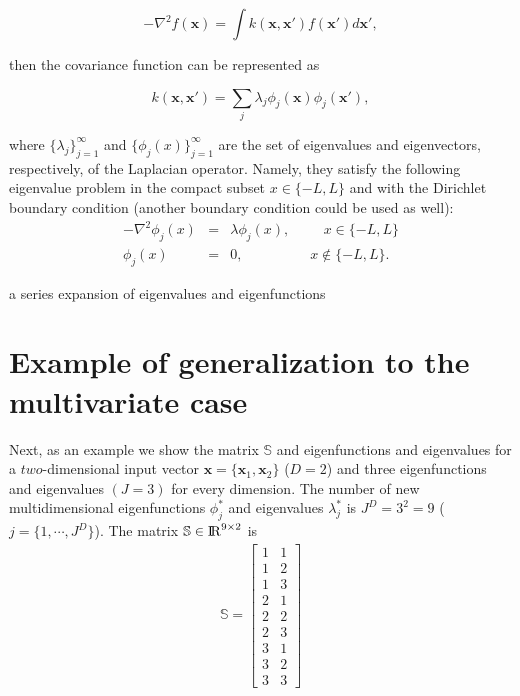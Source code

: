 \documentclass[]{interact}
\theoremstyle{plain}%
\theoremstyle{definition}
\theoremstyle{remark}
\begin{document}
\begin{equation}
-\nabla^2 f(\mathbf{x}) = \int k(\mathbf{x},\mathbf{x}') f(\mathbf{x}') d\mathbf{x}',
\end{equation} 

\noindent then the covariance function can be represented as 

\begin{equation}
k(\mathbf{x},\mathbf{x}')= \sum_j \lambda_j \phi_j(\mathbf{x}) \phi_j(\mathbf{x}'),
\end{equation}

\noindent where $\{\lambda_j\}_{j=1}^{\infty}$ and $\{\phi_j(x)\}_{j=1}^{\infty}$ are the set of eigenvalues and eigenvectors, respectively, of the Laplacian operator. Namely, they satisfy the following eigenvalue problem in the compact subset $x \in \{-L,L\}$ and with the Dirichlet boundary condition (another boundary condition could be used as well):
%
\begin{eqnarray}
-\nabla^2 \phi_j(x)&=&\lambda \phi_j(x), \hspace{1cm}  x\in \{-L,L\} \nonumber \\ 
\phi_j(x)&=&0, \hspace{2cm} x\notin \{-L,L\}.
\end{eqnarray}  

a series expansion of eigenvalues and eigenfunctions 


\section{Example of generalization to the multivariate case}

Next, as an example we show the matrix $\mathbb{S}$ and eigenfunctions and eigenvalues for a $two$-dimensional input vector $\mathbf{x}=\{\mathbf{x}_1,\mathbf{x}_2\}$ ($D=2$) and three eigenfunctions and eigenvalues $(J=3)$ for every dimension. The number of new multidimensional eigenfunctions $\phi^{\ast}_j$ and eigenvalues $\lambda^{\ast}_j$ is $J^D=3^2=9$ ($j=\{1,\cdots,J^D\}$). The matrix $\mathbb{S}\in {\rm I\!R}^{9 \times 2}$ is
%
\begin{eqnarray}
\mathbb{S}=
\left[ {\begin{array}{cc}
1 & 1 \nonumber \\
1 & 2 \\
1 & 3 \\
2 & 1 \\
2 & 2 \\
2 & 3 \\
3 & 1 \\
3 & 2 \\
3 & 3
\end{array} } \right]
\end{eqnarray} 
\end{document}

